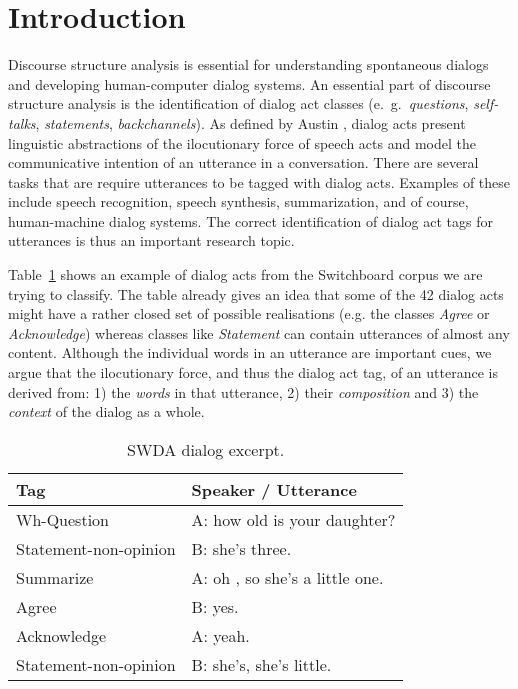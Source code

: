 \section{Introduction}\label{sec:intro}
Discourse structure analysis is essential for understanding spontaneous dialogs and developing human-computer dialog systems.
An essential part of discourse structure analysis is the identification of dialog act classes (e.\ g.\ \emph{questions}, \emph{self-talks}, \emph{statements}, \emph{backchannels}).
As defined by Austin , dialog acts present linguistic abstractions of the ilocutionary force of speech acts and model the communicative intention of an utterance in a conversation.
There are several tasks that are require utterances to be tagged with dialog acts.
Examples of these include speech recognition, speech synthesis, summarization, and of course, human-machine dialog systems.
The correct identification of dialog act tags for utterances is thus an important research topic.


Table~\ref{tab:swda_example} shows an example of dialog acts from the Switchboard corpus we are trying to classify.
The table already gives an idea that some of the 42 dialog acts might have a rather closed set of possible realisations (e.g. the classes \emph{Agree} or \emph{Acknowledge}) whereas classes like \emph{Statement} can contain utterances of almost any content.
Although the individual words in an utterance are important cues, we argue that the ilocutionary force, and thus the dialog act tag, of an utterance is derived from: 1) the \emph{words} in that utterance, 2) their \emph{composition} and 3) the \emph{context} of the dialog as a whole. 



\begin{table}[h]
\centering
\small
\begin{tabular}{ll}
\hline
\textbf{Tag} & \textbf{Speaker / Utterance}
\\
\hline
Wh-Question & A: how old is your daughter?\\
Statement-non-opinion & B: she's three.\\
Summarize & A: oh , so she's a little one.\\
Agree & B: yes.\\
Acknowledge & A: yeah.\\
Statement-non-opinion & B: she's, she's little.\\
\hline
\end{tabular}
\caption{SWDA dialog excerpt.}
\label{tab:swda_example}
\end{table}

